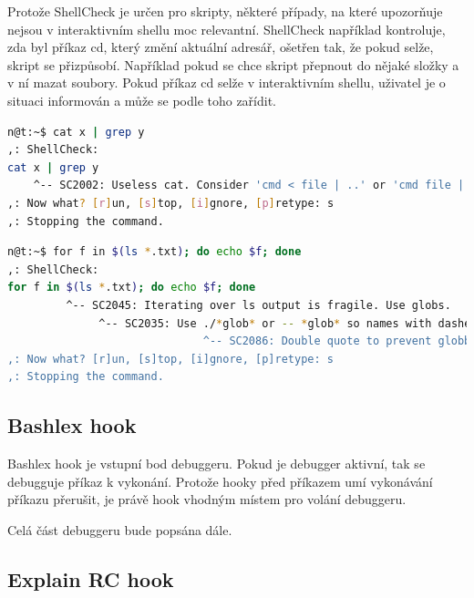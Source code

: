\documentclass[thesis=M,czech]{FITthesis}[2012/06/26]
\begin{document}
Protože ShellCheck je určen pro skripty, některé případy, na které upozorňuje nejsou v interaktivním shellu moc relevantní. ShellCheck například kontroluje, zda byl příkaz cd, který změní aktuální adresář, ošetřen tak, že pokud selže, skript se přizpůsobí. Například pokud se chce skript přepnout do nějaké složky a v ní mazat soubory. Pokud příkaz cd selže v interaktivním shellu, uživatel je o situaci informován a může se podle toho zařídit.

\begin{minipage}{\linewidth}
\begin{lstlisting}[language=bash, caption={ShellCheck}, label={lst:sccat}]
n@t:~$ cat x | grep y
,: ShellCheck:
cat x | grep y
    ^-- SC2002: Useless cat. Consider 'cmd < file | ..' or 'cmd file | ..' instead.
,: Now what? [r]un, [s]top, [i]gnore, [p]retype: s
,: Stopping the command.
\end{lstlisting}
\end{minipage}


\begin{minipage}{\linewidth}
\begin{lstlisting}[language=bash, caption={ShellCheck}, label={lst:csfor}]
n@t:~$ for f in $(ls *.txt); do echo $f; done
,: ShellCheck:
for f in $(ls *.txt); do echo $f; done
         ^-- SC2045: Iterating over ls output is fragile. Use globs.
              ^-- SC2035: Use ./*glob* or -- *glob* so names with dashes won't become options.
                              ^-- SC2086: Double quote to prevent globbing and word splitting.
,: Now what? [r]un, [s]top, [i]gnore, [p]retype: s
,: Stopping the command.

\end{lstlisting}
\end{minipage}







\subsection{Bashlex hook}

Bashlex hook je vstupní bod debuggeru. Pokud je debugger aktivní, tak se debugguje příkaz k vykonání. Protože hooky před příkazem umí vykonávání příkazu přerušit, je právě hook vhodným místem pro volání debuggeru.

Celá část debuggeru bude popsána dále.

\subsection{Explain RC hook}
\end{document}
